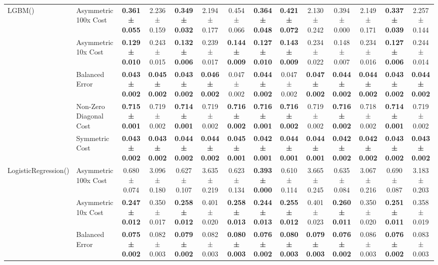 \begin{table}[H]
{\begin{tabular}{llcccccccccccc}
\cline{1-14}
\multirow[t]{5}{*}{LGBM()} & Asymmetric 100x Cost & \textbf{0.361 ± 0.055} & 2.236 ± 0.159 & \textbf{0.349 ± 0.032} & 2.194 ± 0.177 & 0.454 ± 0.066 & \textbf{0.364 ± 0.048} & \textbf{0.421 ± 0.072} & 2.130 ± 0.242 & 0.394 ± 0.000 & 2.149 ± 0.171 & \textbf{0.337 ± 0.039} & 2.257 ± 0.144 \\
 & Asymmetric 10x Cost & \textbf{0.129 ± 0.010} & 0.243 ± 0.015 & \textbf{0.132 ± 0.006} & 0.239 ± 0.017 & \textbf{0.144 ± 0.009} & \textbf{0.127 ± 0.010} & \textbf{0.143 ± 0.009} & 0.234 ± 0.022 & 0.148 ± 0.007 & 0.234 ± 0.016 & \textbf{0.127 ± 0.006} & 0.244 ± 0.014 \\
 & Balanced Error & \textbf{0.043 ± 0.002} & \textbf{0.045 ± 0.002} & \textbf{0.043 ± 0.002} & \textbf{0.046 ± 0.002} & 0.047 ± 0.002 & \textbf{0.044 ± 0.002} & 0.047 ± 0.002 & \textbf{0.047 ± 0.002} & \textbf{0.044 ± 0.002} & \textbf{0.044 ± 0.002} & \textbf{0.043 ± 0.002} & \textbf{0.044 ± 0.002} \\
 & Non-Zero Diagonal Cost & \textbf{0.715 ± 0.001} & 0.719 ± 0.002 & \textbf{0.714 ± 0.001} & 0.719 ± 0.002 & \textbf{0.716 ± 0.002} & \textbf{0.716 ± 0.001} & \textbf{0.716 ± 0.002} & 0.719 ± 0.002 & \textbf{0.716 ± 0.002} & 0.718 ± 0.002 & \textbf{0.714 ± 0.001} & 0.719 ± 0.002 \\
 & Symmetric Cost & \textbf{0.043 ± 0.002} & \textbf{0.043 ± 0.002} & \textbf{0.044 ± 0.002} & \textbf{0.044 ± 0.002} & \textbf{0.045 ± 0.001} & \textbf{0.042 ± 0.001} & \textbf{0.044 ± 0.001} & \textbf{0.044 ± 0.001} & \textbf{0.042 ± 0.002} & \textbf{0.042 ± 0.002} & \textbf{0.043 ± 0.002} & \textbf{0.043 ± 0.002} \\
\cline{1-14}
\multirow[t]{5}{*}{LogisticRegression()} & Asymmetric 100x Cost & 0.680 ± 0.074 & 3.096 ± 0.180 & 0.627 ± 0.107 & 3.635 ± 0.219 & 0.623 ± 0.134 & \textbf{0.393 ± 0.000} & 0.610 ± 0.114 & 3.665 ± 0.245 & 0.635 ± 0.084 & 3.067 ± 0.216 & 0.690 ± 0.087 & 3.183 ± 0.203 \\
 & Asymmetric 10x Cost & \textbf{0.247 ± 0.012} & 0.350 ± 0.017 & \textbf{0.258 ± 0.012} & 0.401 ± 0.020 & \textbf{0.258 ± 0.013} & \textbf{0.244 ± 0.013} & \textbf{0.255 ± 0.012} & 0.401 ± 0.023 & \textbf{0.260 ± 0.011} & 0.350 ± 0.020 & \textbf{0.251 ± 0.011} & 0.358 ± 0.019 \\
 & Balanced Error & \textbf{0.075 ± 0.002} & 0.082 ± 0.003 & \textbf{0.079 ± 0.002} & 0.082 ± 0.003 & \textbf{0.080 ± 0.003} & \textbf{0.076 ± 0.002} & \textbf{0.080 ± 0.003} & \textbf{0.079 ± 0.003} & \textbf{0.076 ± 0.002} & 0.086 ± 0.003 & \textbf{0.076 ± 0.002} & 0.083 ± 0.003 \\

\end{tabular}}
\end{table}
